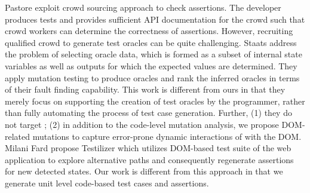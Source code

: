 Pastore \etal \cite{pastore:icst13} exploit crowd sourcing approach to check assertions. The developer produces tests and provides sufficient API documentation for the crowd such that crowd workers can determine the correctness of assertions. However, recruiting qualified crowd to generate test oracles can be quite challenging.
Staats \etal \cite{staats:icse12} address the problem of selecting oracle data,  which is formed as a subset of internal state variables as well as outputs for which the expected values are determined.
They apply mutation testing to produce oracles and rank the inferred oracles in terms of their fault finding capability.
This work is different from ours in that they merely focus on supporting the creation of test oracles by the programmer, rather than fully automating the process of test case generation. Further, (1) they do not target \javascript; 
(2) in addition to the code-level mutation analysis, we propose DOM-related mutations to capture error-prone \cite{Ocariza:esem2013} dynamic interactions of \javascript with the DOM.
Milani Fard \etal \cite{milanifard:ase14} propose Testilizer which utilizes DOM-based test suite of the web application to explore alternative paths and consequently regenerate assertions for new detected states. Our work is different from this approach in that we generate unit level code-based test cases and assertions.

 


